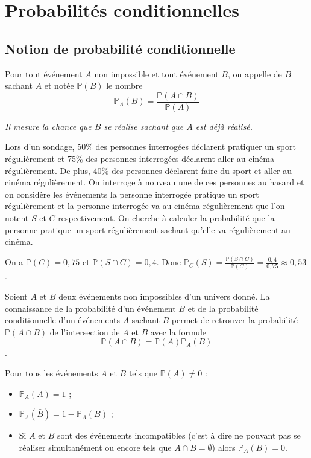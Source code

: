 \documentclass[french]{book}
\begin{document}
\chapter{Probabilités conditionnelles}
\section{Notion de probabilité conditionnelle}


\begin{defn}
Pour tout événement $A$ non impossible et tout événement $B$, on appelle  de $B$ sachant $A$ et notée $\mathbb{P}(B)$ le nombre $$\mathbb{P}_A(B)=\frac{\mathbb{P}(A\cap B)}{\mathbb{P}(A)}$$

\emph{Il mesure la chance que $B$ se réalise sachant que $A$ est déjà réalisé.}
\end{defn}

\begin{exemple}
Lors d'un sondage, 50\% des personnes interrogées déclarent pratiquer un sport régulièrement et 75\% des
personnes interrogées déclarent aller au cinéma régulièrement. De plus, 40\% des personnes déclarent faire du sport et aller au cinéma régulièrement. On interroge à nouveau une de ces personnes au hasard et on considère les événements \og{}la personne interrogée pratique un sport régulièrement\fg{} et \og{}la personne interrogée va au cinéma régulièrement\fg{} que l'on notent $S$ et $C$ respectivement.
On cherche à calculer la probabilité que la personne pratique un sport régulièrement sachant qu'elle va régulièrement au cinéma.

On a $\mathbb{P}(C)=0,75$ et $\mathbb{P}(S\cap C)=0,4$. Donc $\mathbb{P}_C(S)=\frac{\mathbb{P}(S\cap C)}{\mathbb{P}(C)}=\frac{0,4}{0,75}\approx 0,53$.
\end{exemple}


\begin{prop}
Soient $A$ et $B$ deux événements non impossibles d'un univers donné. La connaissance de la probabilité d'un événement $B$ et de la probabilité conditionnelle d'un événements $A$ sachant $B$ permet de retrouver la probabilité $\mathbb{P}(A\cap B)$ de l'intersection de $A$ et $B$ avec la formule $$\mathbb{P}(A\cap B)=\mathbb{P}(A)\mathbb{P}_A(B)$$.
\end{prop}


\begin{prop}
Pour tous les événements $A$ et $B$ tels que $\mathbb{P}(A)\neq 0$ :
\begin{itemize}
\item[$\bullet$] $\mathbb{P}_A(A)=1$ ;
\item[$\bullet$] $\mathbb{P}_A(\bar{B})=1-\mathbb{P}_A(B)$ ;
\item[$\bullet$] Si $A$ et $B$ sont des événements incompatibles (c'est à dire ne pouvant pas se réaliser simultanément ou encore tels que $A\cap B=\emptyset$) alors $\mathbb{P}_A(B)=0$.
\end{itemize}
\end{prop}
\end{document}
